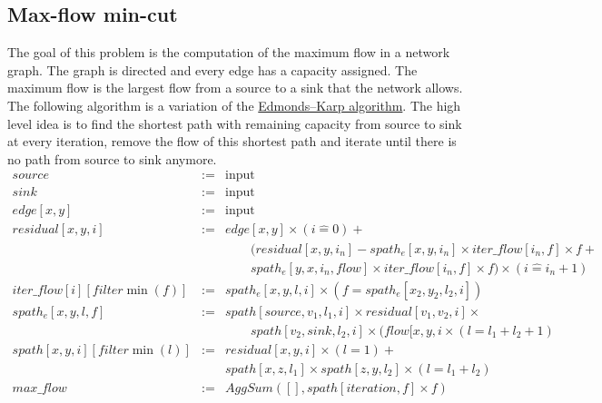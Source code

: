 \documentclass[11pt]{article}
\begin{document}
\subsection{Max-flow min-cut}
The goal of this problem is the computation of the maximum flow in a network graph.
The graph is directed and every edge has a capacity assigned.
The maximum flow is the largest flow from a source to a sink that the network allows.
The following algorithm is a variation of the \href{http://en.wikipedia.org/wiki/Edmonds-Karp_algorithm}{Edmonds–Karp algorithm}. The high level idea is to find the shortest path with remaining capacity from source to sink at every iteration, remove the flow of this shortest path and iterate until there is no path from source to sink anymore.
\[\begin{array}{rcl}
source &:=& \text{input} \\
sink &:=& \text{input} \\
edge[x,y] &:=& \text{input} \\
residual[x,y,i] &:=& edge[x,y] \times (i \hat= 0) + \\
&&\qquad (residual[x,y,i_n] - spath_e[x,y,i_n] \times iter\_flow[i_n,f] \times f + \\
&&\qquad spath_e[y,x,i_n,flow] \times iter\_flow[i_n,f] \times f) \times (i \hat= i_n + 1)\\
iter\_flow[i][filter \min(f)] &:=& spath_e[x,y,l,i] \times (f = spath_e[x_2,y_2,l_2,i]) \\
spath_e[x,y,l,f] &:=& spath[source,v_1,l_1,i] \times residual[v_1,v_2,i] \times\\
&&\qquad  spath[v_2,sink,l_2,i] \times (flow[x,y,i\times (l = l_1 + l_2 + 1) \\ 
spath[x,y,i][filter \min(l)] &:=& residual[x,y,i] \times (l = 1) +\\
&& spath[x,z,l_1] \times spath[z,y,l_2] \times (l = l_1 + l_2) \\
max\_flow &:=& AggSum([], spath[iteration, f] \times f)
\end{array}\]
\end{document}
